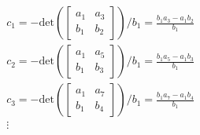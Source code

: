 \documentclass[twoside]{article}
\begin{document}
\begin{align*}
& c_1 = - \mathrm{det}\left( \left[ \begin{array}{cc} a_1 & a_3 \\ b_1
                                                         &
                                                           b_2 \end{array}
                                                           \right]
                                                           \right) / b_1
=
\frac{b_1 a_3 - a_1 b_2 }{b_1}
\\
&c_2 = - \mathrm{det}\left( \left[ \begin{array}{cc} a_1 & a_5 \\ b_1
                                                         &
                                                           b_3 \end{array}
                                                           \right]
                                                           \right) / b_1
=
\frac{b_1 a_5 - a_1 b_3 }{b_1}
\\
&c_3 = - \mathrm{det}\left( \left[ \begin{array}{cc} a_1 & a_7 \\ b_1
                                                         &
                                                           b_4 \end{array}
                                                           \right]
                                                           \right) / b_1
=
\frac{b_1 a_7 - a_1 b_4 }{b_1}
\\
&\vdots
\end{align*}  
\end{document}
